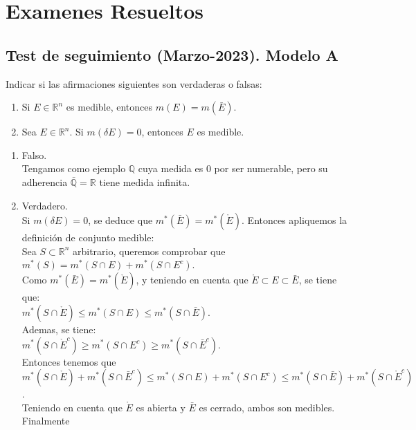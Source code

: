 \section{Examenes Resueltos}

\subsection{Test de seguimiento (Marzo-2023). Modelo A}

\begin{problem}{1}
    Indicar si las afirmaciones siguientes son verdaderas o falsas:
    \begin{enumerate}
        \item Si $E \in \mathbb{R}^n$ es medible, entonces $m(E) = m(\bar{E})$.
        \item Sea $E \in \mathbb{R}^n$. Si $m(\delta E)=0$, entonces $E$ es medible.
    \end{enumerate}
\end{problem}

\begin{sol}
    \begin{enumerate}
        \item Falso. \\
        Tengamos como ejemplo $\mathbb{Q}$ cuya medida es $0$ por ser numerable, pero su adherencia $\bar{\mathbb{Q}}=\mathbb{R}$ tiene medida infinita.
        \item Verdadero. \\
        Si $m(\delta E)=0$, se deduce que $m^{*}(\bar{E})=m^{*}(\mathring{E})$. Entonces apliquemos la definición de conjunto medible: \\
        Sea $S \subset \mathbb{R}^n$ arbitrario, queremos comprobar que $m^{*}(S)=m^{*}(S \cap E)+m^{*}(S \cap E^c)$. \\
        Como $m^{*}(\bar{E})=m^{*}(\mathring{E})$, y teniendo en cuenta que $\mathring{E} \subset E \subset \bar{E}$, se tiene que: \\
        $m^{*}(S \cap \mathring{E}) \leq m^{*}(S \cap E) \leq m^{*}(S \cap \bar{E})$. \\
        Ademas, se tiene: \\
        $m^{*}(S \cap \mathring{E}^c) \geq m^{*}(S \cap E^c) \geq m^{*}(S \cap \bar{E}^c)$. \\
        Entonces tenemos que $m^{*}(S \cap \mathring{E})+m^{*}(S \cap \bar{E}^c) \leq m^{*}(S \cap E)+m^{*}(S \cap E^c) \leq m^{*}(S \cap \bar{E})+m^{*}(S \cap \mathring{E}^c)$. \\
        Teniendo en cuenta que $\mathring{E}$ es abierta y $\bar{E}$ es cerrado, ambos son medibles. \\
        Finalmente 
    \end{enumerate}
\end{sol}